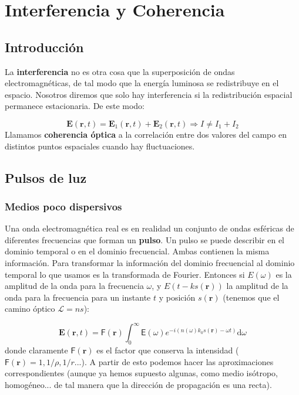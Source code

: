 \documentclass[12pt,a4paper]{book}
\numberwithin{equation}{section}
\numberwithin{figure}{section}
\newcommand{\D}{\mathrm{d}}
\newcommand{\1}{_{(1)}}
\newcommand{\2}{_{(2)}}
\newcommand{\rn}{\mathbf{r}}
\newcommand{\En}{\mathbf{E}}
\theoremstyle{definition}
\begin{document}
\hrulefill


\newpage

\chapter{Interferencia y Coherencia}

\section{Introducción}

La \textbf{interferencia} no es otra cosa que la superposición de ondas electromagnéticas, de tal modo que la energía luminosa se redistribuye en el espacio. Nosotros diremos que solo hay interferencia si la redistribución espacial permanece estacionaria. De este modo:

$$\En (\rn,t) = \En_1 (\rn,t) + \En_2 (\rn,t) \Longrightarrow I \neq I_1 + I_2$$
Llamamos \textbf{coherencia óptica} a la correlación entre dos valores del campo en distintos puntos espaciales cuando hay fluctuaciones. \\


\section{Pulsos de luz}

\subsection{Medios poco dispersivos}

Una onda electromagnética real es en realidad un conjunto de ondas esféricas de diferentes frecuencias que forman un \textbf{pulso}. Un pulso se puede describir en el dominio temporal o en el dominio frecuencial. Ambas contienen la misma información. Para transformar la información del dominio frecuencial al dominio temporal lo que usamos es la transformada de Fourier. Entonces si $E(\omega)$ es la amplitud de la onda para la frecuencia $\omega$, y $E(t-ks(\rn))$ la amplitud de la onda para la frecuencia para un instante $t$ y posición $s(\rn)$ (tenemos que el camino óptico $\mathcal{L}=ns$): 

\begin{equation}
\En (\rn,t) = \mathsf{F} (\rn) \int_0^\infty \mathbf{\mathsf{E}} (\omega) e^{-i (n(\omega)k_0 s(\rn) - \omega t )} \D \omega
\end{equation}
donde claramente $\mathsf{F} (\rn) $ es el factor que conserva la intensidad ($\mathsf{F} (\rn) = 1,1/\rho,1/r...$). A partir de esto podemos hacer las aproximaciones correspondientes  (aunque ya hemos supuesto algunas, como medio isótropo, homogéneo... de tal manera que la dirección de propagación es una recta). \\
\end{document}
